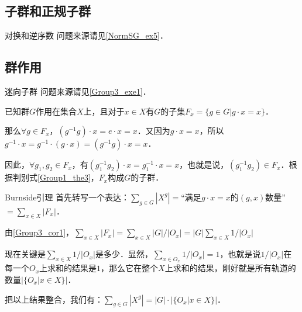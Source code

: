 
\subsection{子群和正规子群}

\begin{example}{对换和逆序数}\label{GroupP_ex1}
问题来源请见\autoref{NormSG_ex5}．



\end{example}

\subsection{群作用}

\begin{example}{迷向子群}\label{GroupP_ex2}
问题来源请见\autoref{Group3_exe1}．

已知群$G$作用在集合$X$上，且对于$x\in X$有$G$的子集$F_x=\{g\in G|g\cdot x=x\}$．

那么$\forall g\in F_x$，$(g^{-1}g)\cdot x=e\cdot x=x$．又因为$g\cdot x=x$，所以$g^{-1}\cdot x=g^{-1}\cdot(g\cdot x)=(g^{-1}g)\cdot x=x$．

因此，$\forall g_1, g_2\in F_x$，有$(g_1^{-1}g_2)\cdot x=g_1^{-1}\cdot x=x$，也就是说，$(g_1^{-1}g_2)\in F_x$．根据判别式\autoref{Group1_the3}，$F_x$构成$G$的子群．




\end{example}

\begin{example}{Burnside引理}\label{GroupP_ex3}
首先转写一个表达：$\sum_{g\in G}|X^g|=$“满足$g\cdot x=x$的$(g, x)$数量”$=\sum_{x\in X}|F_x|$．

由\autoref{Group3_cor1}，$\sum_{x\in X}|F_x|=\sum_{x\in X} |G|/|O_x|=|G| \sum_{x\in X} 1/|O_x|$

现在关键是$\sum_{x\in X} 1/|O_x|$是多少．显然，$\sum_{x\in O_x} 1/|O_x|=1$，也就是说$1/|O_x|$在每一个$O_x$上求和的结果是$1$，那么它在整个$X$上求和的结果，刚好就是所有轨道的数量$|\{O_x|x\in X\}|$．

把以上结果整合，我们有：$\sum_{g\in G}|X^g|=|G|\cdot|\{O_x|x\in X\}|$．
\end{example}